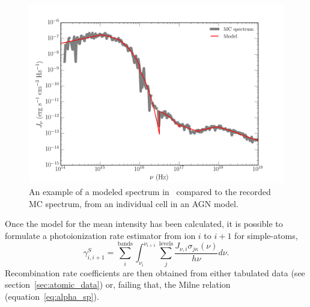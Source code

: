 \begin{figure}
\centering
\includegraphics[width=1.0\textwidth]{figures/03-radtrans/cell_spec.png}
\caption
{
An example of a modeled spectrum in \py\ compared to the recorded MC spectrum,
from an individual cell in an AGN model.
} 
\label{fig:cell_spec}
\end{figure}

Once the model for the mean intensity has been calculated, it is possible
to formulate a photoionization rate estimator from ion $i$ to $i+1$ 
for simple-atoms,
\begin{equation}
\gamma_{i,i+1}^S = \sum_i^{\mathrm{bands}} \int_{\nu_i}^{\nu_{i+1}} 
\sum_j^{\mathrm{levels}} \frac{J_{\nu,i} \sigma_{j\kappa}(\nu) }{h \nu} d\nu.
\end{equation}
Recombination rate coefficients are then obtained from 
either tabulated data (see section~\ref{sec:atomic_data})
or, failing that, the Milne relation (equation~\ref{eq:alpha_sp}).

